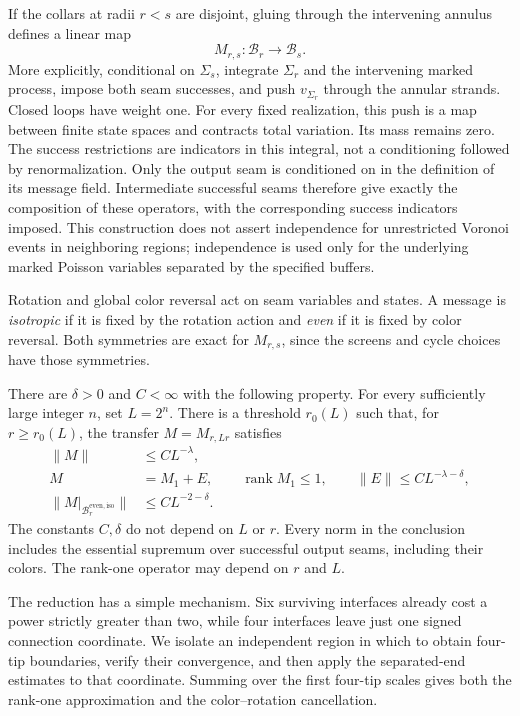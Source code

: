 If the collars at radii $r<s$ are disjoint, gluing through the intervening
annulus defines a linear map
\[
                  M_{r,s}:\mathcal B_r\longrightarrow\mathcal B_s.
\]
More explicitly, conditional on $\Sigma_s$, integrate $\Sigma_r$ and
the intervening marked process, impose both seam successes, and push
$v_{\Sigma_r}$ through the annular strands.  Closed loops have weight
one.  For every fixed realization, this push is a map between finite
state spaces and contracts total variation.  Its mass remains zero.
The success restrictions are indicators in this integral, not a
conditioning followed by renormalization.  Only the output seam is
conditioned on in the definition of its message field.
Intermediate successful seams therefore give exactly the composition of
these operators, with the corresponding success indicators imposed.
This construction does not assert independence for unrestricted Voronoi
events in neighboring regions; independence is used only for the
underlying marked Poisson variables separated by the specified buffers.

Rotation and global color reversal act on seam variables and states.  A
message is \emph{isotropic} if it is fixed by the rotation action and
\emph{even} if it is fixed by color reversal.  Both symmetries are exact
for $M_{r,s}$, since the screens and cycle choices have those symmetries.

\begin{proposition}
\label{tr:block}
There are $\delta>0$ and $C<\infty$ with the following property.  For every
sufficiently large integer $n$, set $L=2^n$.  There is a threshold $r_0(L)$
such that, for $r\ge r_0(L)$, the transfer $M=M_{r,Lr}$ satisfies
\begin{align}
 \|M\|&\le C L^{-\lambda}, \label{tr:block-size}\\
 M&=M_1+E,\qquad \operatorname{rank}M_1\le1,
       \qquad \|E\|\le C L^{-\lambda-\delta},
       \label{tr:block-rank}\\
 \|M|_{\mathcal B_r^{\mathrm{even,iso}}}\|
       &\le C L^{-2-\delta}.
       \label{tr:block-cancellation}
\end{align}
The constants $C,\delta$ do not depend on $L$ or $r$.  Every norm in the
conclusion includes the essential supremum over successful output
seams, including their colors.  The rank-one operator may depend on
$r$ and $L$.
\end{proposition}

The reduction has a simple mechanism.  Six surviving interfaces already
cost a power strictly greater than two, while four interfaces leave just
one signed connection coordinate.  We isolate an independent region in
which to obtain four-tip boundaries, verify their convergence, and then
apply the separated-end estimates to that coordinate.  Summing over the
first four-tip scales gives both the rank-one approximation and the
color--rotation cancellation.

